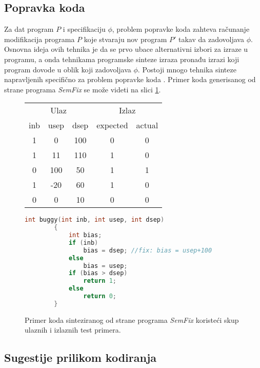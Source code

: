 \subsection{Popravka koda}
\label{subsec:PopravkaKoda}

Za dat program $P$ i specifikaciju $\phi$, problem popravke koda zahteva ra\-ču\-na\-nje modifikacija programa $P$ koje stvaraju nov program $P'$ takav da zadovoljava $\phi$. Osnovna ideja ovih tehnika je da se prvo ubace alternativni izbori za izraze u programu, a onda tehnikama programske sinteze izraza pronađu izrazi koji program dovode u oblik koji zadovoljava $\phi$. Postoji mnogo tehnika sinteze napravljenih specifično za problem popravke koda \cite{Qlose, ProgramRepairAsAGame}. Primer koda generisanog od strane programa \emph{SemFix} \cite{SemFix} se može videti na slici \ref{fig:CodeRepair}.

\begin{figure}[!h]
    \centering
    \begin{tabular}{ccc|cc}
        \multicolumn{3}{c|}{Ulaz} & \multicolumn{2}{c}{Izlaz}\\
        inb & usep & dsep & expected & actual \\
        \hline
        1 & 0 & 100 & 0 & 0 \\
        1 & 11 & 110 & 1 & 0 \\
        0 & 100 & 50 & 1 & 1 \\
        1 & -20 & 60 & 1 & 0 \\
        0 & 0 & 10 & 0 & 0 \\
    \end{tabular}

    \centering
    \begin{lstlisting}[language=C]
        int buggy(int inb, int usep, int dsep)
        {
            int bias;
            if (inb)
                bias = dsep; //fix: bias = usep+100
            else
                bias = usep;
            if (bias > dsep)
                return 1;
            else
                return 0;
        }
    \end{lstlisting}

    \caption{Primer koda sinteziranog od strane programa \emph{SemFix} \cite{SemFix} koristeći skup ulaznih i izlaznih test primera.}
    \label{fig:CodeRepair}
\end{figure}

\subsection{Sugestije prilikom kodiranja}
\label{subsec:SugestijePrilikomKodiranja}

